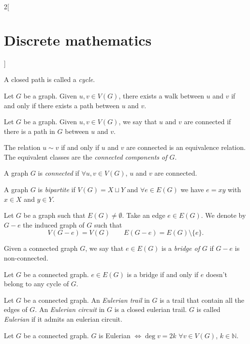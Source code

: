\documentclass[class=article,10pt,crop=false]{standalone}
\begin{document}
\begin{multicols}{2}[\section{Discrete mathematics}]
\begin{definition}
A closed path is called a \textit{cycle}.
\end{definition}
\begin{prop}
Let $G$ be a graph. Given $u,v\in V(G)$, there exists a walk between $u$ and $v$ if and only if there exists a path between $u$ and $v$.
\end{prop}
\begin{definition}
Let $G$ be a graph. Given $u,v\in V(G)$, we say that $u$ and $v$ are connected if there is a path in $G$ between $u$ and $v$.
\end{definition}
\begin{prop}
The relation $u\sim v$ if and only if $u$ and $v$ are connected is an equivalence relation. The equivalent classes are the \textit{connected components of $G$}.
\end{prop}
\begin{definition}
A graph $G$ is \textit{connected} if $\forall u,v\in V(G)$, $u$ and $v$ are connected.
\end{definition}
\begin{definition}
A graph $G$ is \textit{bipartite} if $V(G)=X\sqcup Y$ and $\forall e\in E(G)$ we have $e=xy$ with $x\in X$ and $y\in Y$.
\end{definition}
\begin{definition}
Let $G$ be a graph such that $E(G)\ne\emptyset$. Take an edge $e\in E(G)$. We denote by $G-e$ the induced graph of $G$ such that $$V(G-e)=V(G)\qquad E(G-e)=E(G)\setminus\{e\}.$$
\end{definition}
\begin{definition}
Given a connected graph $G$, we say that $e\in E(G)$ is a \textit{bridge of $G$} if $G-e$ is non-connected.
\end{definition}
\begin{prop}
Let $G$ be a connected graph. $e\in E(G)$ is a bridge if and only if $e$ doesn't belong to any cycle of $G$.
\end{prop}
\begin{definition}
Let $G$ be a connected graph. An \textit{Eulerian trail} in $G$ is a trail that contain all the edges of $G$. An \textit{Eulerian circuit} in $G$ is a closed eulerian trail. $G$ is called \textit{Eulerian} if it admits an eulerian circuit.
\end{definition}
\begin{theorem}
Let $G$ be a connected graph. $G$ is Eulerian $\iff\deg v=2k$ $\forall v\in V(G)$, $k\in\mathbb{N}$.
\end{theorem}

\end{multicols}
\end{document}
